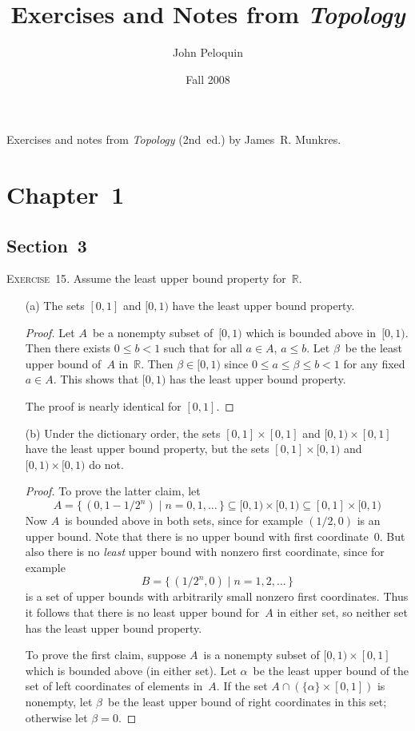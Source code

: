 \documentclass[letterpaper]{article}
\title{Exercises and Notes from \emph{Topology}}
\author{John Peloquin}
\date{Fall 2008}
\newcommand{\exercise}[1]{\goodbreak\noindent\textsc{Exercise~{#1}.}}
\newcommand{\R}{\mathbb{R}}
\newcommand{\sect}{\cap}
\begin{document}
\maketitle
Exercises and notes from \emph{Topology} (2nd~ed.) by James~R. Munkres.
\section*{Chapter~1}
\subsection*{Section~3}
\exercise{15} Assume the least upper bound property for~$\R$.
\begin{enumerate}[itemsep=0pt]
\item[(a)] The sets $[0,1]$ and $[0,1)$ have the least upper bound property.
\begin{proof}
Let $A$~be a nonempty subset of~$[0,1)$ which is bounded above in~$[0,1)$. Then there exists $0\le b<1$ such that for all $a\in A$, $a\le b$. Let $\beta$~be the least upper bound of~$A$ in~$\R$. Then $\beta\in[0,1)$ since $0\le a\le\beta\le b<1$ for any fixed $a\in A$. This shows that $[0,1)$ has the least upper bound property.

The proof is nearly identical for $[0,1]$.
\end{proof}
\item[(b)] Under the dictionary order, the sets $[0,1]\times[0,1]$ and $[0,1)\times[0,1]$ have the least upper bound property, but the sets $[0,1]\times[0,1)$ and $[0,1)\times[0,1)$ do not.
\begin{proof}
To prove the latter claim, let
$$A=\{\,(0,1-1/2^n)\mid n=0,1,\ldots\,\}\subseteq[0,1)\times[0,1)\subseteq[0,1]\times[0,1)$$
Now $A$~is bounded above in both sets, since for example $(1/2,0)$ is an upper bound. Note that there is no upper bound with first coordinate~$0$. But also there is no \emph{least} upper bound with nonzero first coordinate, since for example
$$B=\{\,(1/2^n,0)\mid n=1,2,\ldots\,\}$$
is a set of upper bounds with arbitrarily small nonzero first coordinates. Thus it follows that there is no least upper bound for~$A$ in either set, so neither set has the least upper bound property.

To prove the first claim, suppose $A$~is a nonempty subset of $[0,1)\times[0,1]$ which is bounded above (in either set). Let $\alpha$~be the least upper bound of the set of left coordinates of elements in~$A$. If the set $A\sect(\{\alpha\}\times[0,1])$ is nonempty, let $\beta$~be the least upper bound of right coordinates in this set; otherwise let $\beta=0$.


\end{proof}
\end{enumerate}
\end{document}
